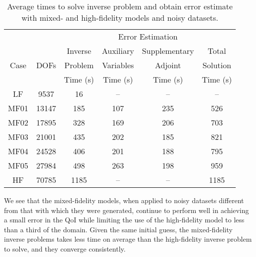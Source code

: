 %
\begin{table}
\caption{Average times to solve inverse problem and obtain error estimate with mixed- and high-fidelity models and noisy datasets.}
\label{tab:ref3D_newdata_times_diffmesh}
\centering
\begin{tabular}{ccc|c|c|c}
\cline{4-5} 
 & & & \multicolumn{2}{|c|}{Error Estimation} & \\
\cline{1-6}
\multicolumn{1}{|c|}{\multirow{3}{*}{Case}} & \multicolumn{1}{|c|}{\multirow{3}{*}{DOFs}} & Inverse & Auxiliary & Supplementary & \multicolumn{1}{|c|}{Total} \\
\multicolumn{1}{|c|}{} & \multicolumn{1}{|c|}{} & Problem & Variables & Adjoint & \multicolumn{1}{|c|}{Solution}\\
\multicolumn{1}{|c|}{} & \multicolumn{1}{|c|}{} & Time (s) &  Time (s) & Time (s) & \multicolumn{1}{|c|}{Time (s)}\\
\cline{1-6}
\multicolumn{1}{|c|}{LF}    & \multicolumn{1}{|c|}{9537}   & 16   & --  & -- & \multicolumn{1}{|c|}{--} \\ \hline
\multicolumn{1}{|c|}{MF01}  & \multicolumn{1}{|c|}{13147}  & 185  & 107 & 235 & \multicolumn{1}{|c|}{526} \\ \hline
\multicolumn{1}{|c|}{MF02}  & \multicolumn{1}{|c|}{17895}  & 328  & 169 & 206 & \multicolumn{1}{|c|}{703} \\ \hline
\multicolumn{1}{|c|}{MF03}  & \multicolumn{1}{|c|}{21001}  & 435  & 202 & 185 & \multicolumn{1}{|c|}{821} \\ \hline
\multicolumn{1}{|c|}{MF04}  & \multicolumn{1}{|c|}{24528}  & 406  & 201 & 188 & \multicolumn{1}{|c|}{795} \\ \hline
\multicolumn{1}{|c|}{MF05}  & \multicolumn{1}{|c|}{27984}  & 498  & 263 & 198 & \multicolumn{1}{|c|}{959} \\ \hline
\multicolumn{1}{|c|}{HF}    & \multicolumn{1}{|c|}{70785}  & 1185 & --  & --  & \multicolumn{1}{|c|}{1185} \\ \hline
\end{tabular}
\end{table}
%
We see that the mixed-fidelity models, when applied to noisy datasets different from that with which they were generated, continue to perform well in achieving a small error in the QoI while limiting the use of the high-fidelity model to less than a third of the domain. Given the same initial guess, the mixed-fidelity inverse problems takes less time on average than the high-fidelity inverse problem to solve, and they converge consistently. 

